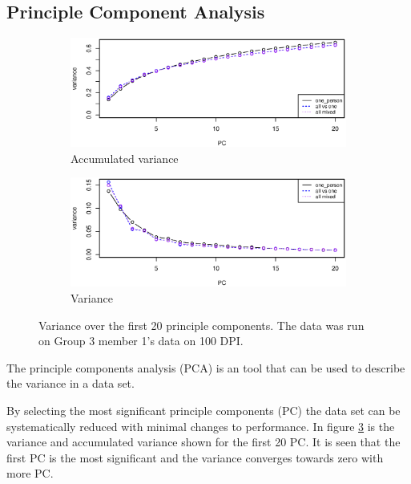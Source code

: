 \subsection{Principle Component Analysis}

\begin{figure}[h]
\begin{subfigure}{0.49\textwidth}
\centering
\includegraphics[width=\textwidth]{graphics/pca_acc_variance}
\caption{Accumulated variance}
\label{fig:pca_accumulated_var}
%
\end{subfigure}
\begin{subfigure}{0.49\textwidth}
\centering
\includegraphics[width=\textwidth]{graphics/pca_variance}
\caption{Variance}
\label{fig:pca_accumulated_var}
\end{subfigure}
\caption{Variance over the first 20 principle components.
The data was run on Group 3 member 1's data on 100 DPI. }
\label{fig:variance}
\end{figure}

The principle components analysis (PCA) is an tool that can be used to describe the variance in a data set.

By selecting the most significant principle components (PC) the data set can be systematically reduced with minimal changes to performance.
In figure \ref{fig:variance} is the variance and accumulated variance shown for the first 20 PC. 
It is seen that the first PC is the most significant and the variance converges towards zero with more PC.

